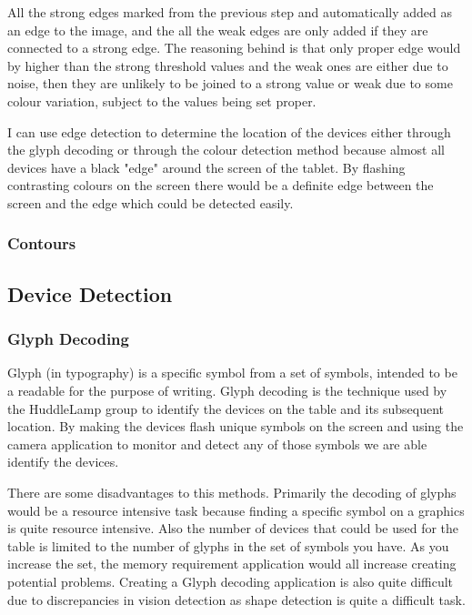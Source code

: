 \begin{enumerate}
All the strong edges marked from the previous step and automatically added as an edge to the image, and the all the weak edges are only added if they are connected to a strong edge. The reasoning behind is that only proper edge would by higher than the strong threshold values and the weak ones are either due to noise, then they are unlikely to be joined to a strong value or weak due to some colour variation, subject to the values being set proper.
\end{enumerate}

I can use edge detection to determine the location of the devices either through the glyph decoding or through the colour detection method because almost all devices have a black "edge" around the screen of the tablet. By flashing contrasting colours on the screen there would be a definite edge between the screen and the edge which could be detected easily.
\subsubsection{Contours}



\subsection{Device Detection}

\subsubsection{Glyph Decoding}
Glyph (in typography) is a specific symbol from a set of symbols, intended to be a readable for the purpose of writing\cite{glyph-wiki}. Glyph decoding is the technique used by the HuddleLamp group to identify the devices on the table and its subsequent location\cite{huddlelamp-paper}. By making the devices flash unique symbols on the screen and using the camera application to monitor and detect any of those symbols we are able identify the devices. 

There are some disadvantages to this methods. Primarily the decoding of glyphs would be a resource intensive task because finding a specific symbol on a graphics is quite resource intensive. Also the number of devices that could be used for the table is limited to the number of glyphs in the set of symbols you have. As you increase the set, the memory requirement application would all increase creating potential problems. Creating a Glyph decoding application is also quite difficult due to discrepancies in vision detection as shape detection is quite a difficult task\cite{shape_recognition}.
